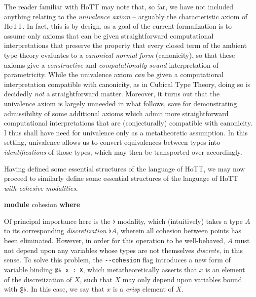 \documentclass[
  12pt]{article}
\newenvironment{Shaded}{\begin{snugshade}}{\end{snugshade}}
\newcommand{\KeywordTok}[1]{\textcolor[rgb]{0.12,0.11,0.11}{\textbf{#1}}}
\newcommand{\NormalTok}[1]{\textcolor[rgb]{0.12,0.11,0.11}{#1}}
\begin{document}
The reader familiar with HoTT may note that, so far, we have not
included anything relating to the \emph{univalence axiom} -- arguably
the characteristic axiom of HoTT. In fact, this is by design, as a goal
of the current formalization is to assume only axioms that can be given
straightforward computational interpretations that preserve the property
that every closed term of the ambient type theory evaluates to a
\emph{canonical normal form} (canonicity), so that these axioms give a
\emph{constructive} and \emph{computationally sound} interpretation of
parametricity. While the univalence axiom \emph{can} be given a
computational interpretation compatible with canonicity, as in Cubical
Type Theory, doing so is decidedly \emph{not} a straightforward matter.
Moreover, it turns out that the univalence axiom is largely unneeded in
what follows, save for demonstrating admissibility of some additional
axioms which admit more straightforward computational interpretations
that are (conjecturally) compatible with canonicity. I thus shall have
need for univalence only as a metatheoretic assumption. In this setting,
univalence allows us to convert equivalences between types into
\emph{identifications} of those types, which may then be transported
over accordingly.

Having defined some essential structures of the language of HoTT, we may
now proceed to similarly define some essential structures of the
language of HoTT \emph{with cohesive modalities}.

\begin{Shaded}
\begin{Highlighting}[]
\KeywordTok{module}\NormalTok{ cohesion }\KeywordTok{where}
\end{Highlighting}
\end{Shaded}

Of principal importance here is the \(\flat\) modality, which
(intuitively) takes a type \(A\) to its corresponding
\emph{discretization} \(\flat A\), wherein all cohesion between points
has been eliminated. However, in order for this operation to be
well-behaved, \(A\) must not depend upon any variables whose types are
not themselves \emph{discrete}, in this sense. To solve this problem,
the \texttt{-\/-cohesion} flag introduces a new form of variable binding
\texttt{@♭\ x\ :\ X}, which metatheoretically asserts that \(x\) is an
element of the discretization of \(X\), such that \(X\) may only depend
upon variables bound with \texttt{@♭}. In this case, we say that \(x\)
is a \emph{crisp} element of \(X\).
\end{document}
